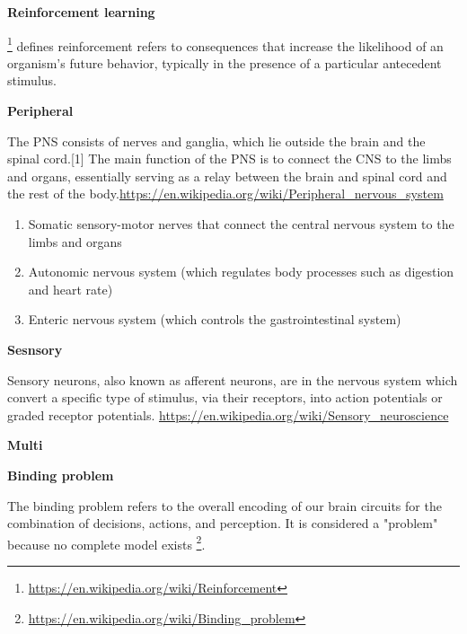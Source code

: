 \documentclass{book}
\providecommand{\ProjectDeepHeading}[2]{%
    \par\medskip\noindent\textbf{#2}\par\smallskip
}
\providecommand{\seeherefooter}[1]{\footnote{\url{#1}}}
\providecommand{\clickurlfooter}[1]{\footnote{\url{#1}}}
\begin{document}
\ProjectDeepHeading{6}{Reinforcement learning}


\clickurlfooter{https://en.wikipedia.org/wiki/Reinforcement} defines reinforcement refers to consequences that increase the likelihood of an organism's future behavior, typically in the presence of a particular antecedent stimulus.

\ProjectDeepHeading{2}{Peripheral}


The PNS consists of nerves and ganglia, which lie outside the brain and the spinal cord.[1] The main function of the PNS is to connect the CNS to the limbs and organs, essentially serving as a relay between the brain and spinal cord and the rest of the body.\url{https://en.wikipedia.org/wiki/Peripheral_nervous_system}
    \begin{enumerate}
        \item Somatic sensory-motor nerves that connect the central nervous system to the limbs and organs
        \item Autonomic nervous system (which regulates body processes such as digestion and heart rate)
        \item Enteric nervous system (which controls the gastrointestinal system)
    \end{enumerate}

\ProjectDeepHeading{2}{Sesnsory}


Sensory neurons, also known as afferent neurons, are in the nervous system which convert a specific type of stimulus, via their receptors, into action potentials or graded receptor potentials.
    \url{https://en.wikipedia.org/wiki/Sensory_neuroscience}

\ProjectDeepHeading{3}{Multi}

\ProjectDeepHeading{4}{Binding problem}


The binding problem refers to the overall encoding of our brain circuits for the combination of decisions, actions, and perception. It is considered a "problem" because no complete model exists \seeherefooter{https://en.wikipedia.org/wiki/Binding_problem}.
\end{document}
